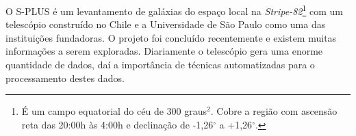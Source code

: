 O S-PLUS \cite{oliveira2019} é um levantamento de galáxias do espaço local na \emph{Stripe-82}\footnote{É um campo equatorial do céu de 300 graus$^{2}$. Cobre a região com ascensão reta das 20:00h às 4:00h e declinação de -1,26$^{\circ}$ a +1,26$^{\circ}$.} com um telescópio construído no Chile e a Universidade de São Paulo como uma das instituições fundadoras. O projeto foi concluído recentemente e existem muitas informações a serem exploradas. Diariamente o telescópio gera uma enorme quantidade de dados, daí a importância de técnicas automatizadas para o processamento destes dados.
